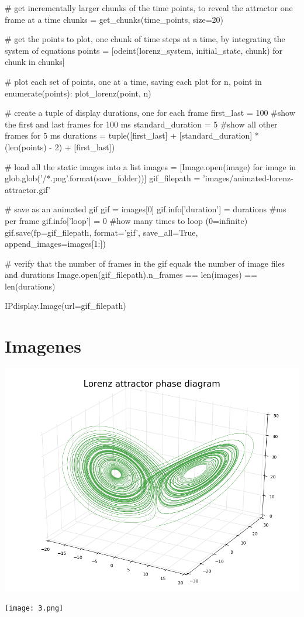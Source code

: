 \documentclass[a4paper,12pt]{article}
\begin{document}
    \# get incrementally larger chunks of the time points, to reveal the attractor one frame at a time
chunks = get\_chunks(time\_points, size=20)

\# get the points to plot, one chunk of time steps at a time, by integrating the system of equations
points = [odeint(lorenz\_system, initial\_state, chunk) for chunk in chunks]

\# plot each set of points, one at a time, saving each plot
for n, point in enumerate(points):
    plot\_lorenz(point, n)
    
    \# create a tuple of display durations, one for each frame
first\_last = 100 \#show the first and last frames for 100 ms
standard\_duration = 5 \#show all other frames for 5 ms
durations = tuple([first\_last] + [standard\_duration] * (len(points) - 2) + [first\_last])

\# load all the static images into a list
images = [Image.open(image) for image in glob.glob('{}/*.png'.format(save\_folder))]
gif\_filepath = 'images/animated-lorenz-attractor.gif'

\# save as an animated gif
gif = images[0]
gif.info['duration'] = durations \#ms per frame
gif.info['loop'] = 0 \#how many times to loop (0=infinite)
gif.save(fp=gif\_filepath, format='gif', save\_all=True, append\_images=images[1:])

\# verify that the number of frames in the gif equals the number of image files and durations
Image.open(gif\_filepath).n\_frames == len(images) == len(durations)

IPdisplay.Image(url=gif\_filepath)
\section*{Imagenes}

\begin{center}
\includegraphics[scale=0.5]{1.png}
\end{center}

\begin{center}
\texttt{[image: 3.png]}
\end{center}
\end{document}
